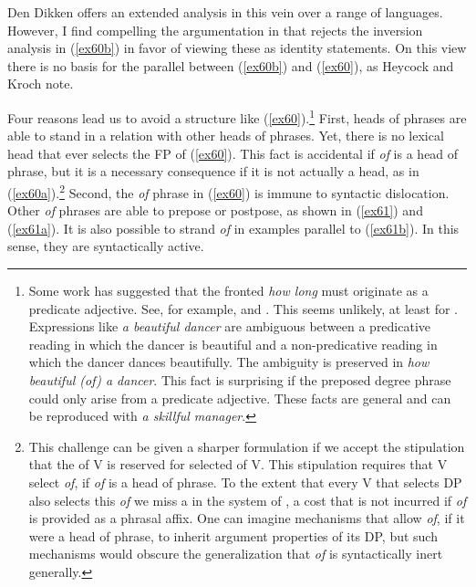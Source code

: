 \documentclass[output=paper,
modfonts
]{LSP/langsci}
\begin{document}
Den Dikken {\citeyearpar{denDikken06}} offers an extended analysis in this vein over a range of languages.  However, I find compelling the argumentation in {\citet{Heycock99}} that rejects the inversion analysis in ({\ref{ex60b}}) in favor of viewing these as identity statements.  On this view there is no basis for the parallel between ({\ref{ex60b}}) and ({\ref{ex60}}), as Heycock and Kroch note.

\newpage 
Four reasons lead us to avoid a structure like ({\ref{ex60}}).{\footnote{Some work has suggested that the fronted {\textit{how long}} must originate as a predicate adjective.  See, for example, {\citet{Wood11}} and \citet{Troseth09}.  This seems unlikely, at least for .  Expressions like {\textit{a beautiful dancer}} are ambiguous between a predicative reading in which the dancer is beautiful and a non-predicative reading in which the dancer dances beautifully.  The ambiguity is preserved in {\textit{how beautiful (of) a dancer}}.  This fact is surprising if the preposed degree phrase could only arise from a predicate adjective.  These facts are general and can be reproduced with {\textit{a skillful manager}}.}}  First, heads of phrases are able to stand in a  relation with other heads of phrases.  Yet, there is no lexical head that ever selects the FP of ({\ref{ex60}}).  This fact is accidental if {\textit{of}} is a head of phrase, but it is a necessary consequence if it is not actually a head, as in ({\ref{ex60a}}).{\footnote{This challenge can be given a sharper formulation if we accept the stipulation that the  of V is reserved for selected  of V.  This stipulation requires that V select {\textit{of}}, if {\textit{of}} is a head of phrase.  To the extent that every V that selects DP also selects this {\textit{of}} we miss a  in the system of , a cost that is not incurred if {\textit{of}} is provided as a phrasal affix.  One can imagine mechanisms that allow {\textit{of}}, if it were a head of phrase, to inherit argument properties of its  DP, but such mechanisms would obscure the generalization that {\textit{of}} is syntactically inert generally.}} Second,  the {\textit{of}} phrase in ({\ref{ex60}}) is immune to syntactic dislocation.  Other {\textit{of}} phrases are able to prepose or postpose, as shown in ({\ref{ex61}}) and ({\ref{ex61a}}).  It is also possible to strand {\textit{of}} in examples parallel to ({\ref{ex61b}}).  In this sense, they are syntactically active.
\end{document}
